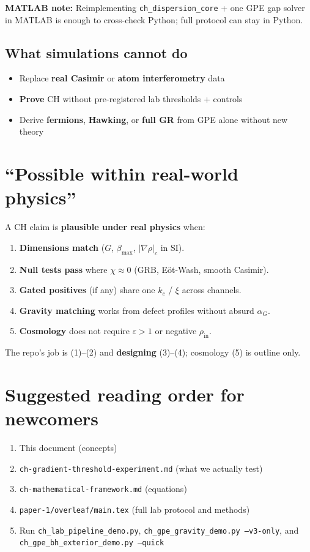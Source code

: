 \documentclass[11pt,a4paper]{article}
\begin{document}
\noindent\textbf{MATLAB note:} Reimplementing \texttt{ch\_dispersion\_core} + one GPE gap solver in MATLAB is enough to cross-check Python; full protocol can stay in Python.

\subsection{What simulations cannot do}

\begin{itemize}[leftmargin=*]
  \item Replace \textbf{real Casimir} or \textbf{atom interferometry} data
  \item \textbf{Prove} CH without pre-registered lab thresholds + controls
  \item Derive \textbf{fermions}, \textbf{Hawking}, or \textbf{full GR} from GPE alone without new theory
\end{itemize}

\section{``Possible within real-world physics''}
\label{sec:plausible}

A CH claim is \textbf{plausible under real physics} when:
\begin{enumerate}[label=\arabic*., leftmargin=*]
  \item \textbf{Dimensions match} ($G$, $\beta_{\max}$, $|\nabla\rho|_c$ in SI).
  \item \textbf{Null tests pass} where $\chi \approx 0$ (GRB, E\"ot-Wash, smooth Casimir).
  \item \textbf{Gated positives} (if any) share one $k_c$ / $\xi$ across channels.
  \item \textbf{Gravity matching} works from defect profiles without absurd $\alpha_G$.
  \item \textbf{Cosmology} does not require $\varepsilon > 1$ or negative $\rho_{\mathrm{in}}$.
\end{enumerate}

The repo's job is (1)--(2) and \textbf{designing} (3)--(4); cosmology (5) is outline only.

\section{Suggested reading order for newcomers}

\begin{enumerate}[label=\arabic*., leftmargin=*]
  \item This document (concepts)
  \item \texttt{ch-gradient-threshold-experiment.md} (what we actually test)
  \item \texttt{ch-mathematical-framework.md} (equations)
  \item \texttt{paper-1/overleaf/main.tex} (full lab protocol and methods)
  \item Run \texttt{ch\_lab\_pipeline\_demo.py}, \texttt{ch\_gpe\_gravity\_demo.py --v3-only}, and \texttt{ch\_gpe\_bh\_exterior\_demo.py --quick}
\end{enumerate}
\end{document}
